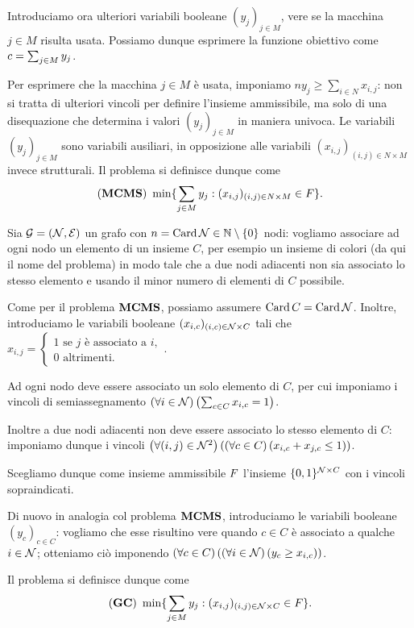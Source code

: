 \begin{Example}
	\par Introduciamo ora ulteriori variabili booleane $(y_j)_{j \in M}$, vere se la macchina $j \in M$ risulta usata. Possiamo dunque esprimere la funzione obiettivo come $c = \sum_{j \in M} y_j$.
	\par Per esprimere che la macchina $j \in M$ \`e usata, imponiamo $ny_j \geq \sum_{i \in N} x_{i,j}$: non si tratta di ulteriori vincoli per definire l'insieme ammissibile, ma solo di una disequazione che determina i valori $(y_j)_{j \in M}$ in maniera univoca. Le variabili $(y_j)_{j \in M}$ sono variabili ausiliari, in opposizione alle variabili $(x_{i,j})_{(i,j) \in N \times M}$ invece strutturali.
	Il problema si definisce dunque come
	$$(\textbf{MCMS})\ \min \lbrace \sum_{j \in M} y_j: (x_{i,j})_{(i,j) \in N \times M} \in F \rbrace.$$
\end{Example}
\begin{Example}
	 Sia $\mathcal{G} = (\mathcal{N},\mathcal{E})$ un grafo con $n = \operatorname{Card}{\mathcal{N}} \in \mathbb{N} \setminus \lbrace 0 \rbrace$ nodi: vogliamo associare ad ogni nodo un elemento di un insieme $C$, per esempio un insieme di colori (da qui il nome del problema) in modo tale che a due nodi adiacenti non sia associato lo stesso elemento e usando il minor numero di elementi di $C$ possibile.
	\par Come per il problema $\textbf{MCMS}$, possiamo assumere $\operatorname{Card}{C} = \operatorname{Card}{\mathcal{N}}$. Inoltre, introduciamo le variabili booleane $(x_{i,c})_{(i,c) \in \mathcal{N} \times C}$ tali che $x_{i,j} = \begin{cases} 1\text{ se }j\text{ \`e associato a }i,\\0\text{ altrimenti.}\end{cases}$.
	\par Ad ogni nodo deve essere associato un solo elemento di $C$, per cui imponiamo i vincoli di semiassegnamento $\left ( \forall i \in \mathcal{N} \right ) \left ( \sum_{c \in C} x_{i,c} = 1 \right )$.
	\par Inoltre a due nodi adiacenti non deve essere associato lo stesso elemento di $C$: imponiamo dunque i vincoli $\left ( \forall (i,j) \in \mathcal{N}^2 \right ) \left ( \left ( \forall c \in C \right ) \left ( x_{i,c} + x_{j,c} \leq 1 \right ) \right )$.
	\par Scegliamo dunque come insieme ammissibile $F$ l'insieme $\lbrace 0, 1\rbrace^{\mathcal{N} \times C}$ con i vincoli sopraindicati.
	\par Di nuovo in analogia col problema $\textbf{MCMS}$, introduciamo le variabili booleane $(y_c)_{c \in C}$: vogliamo che esse risultino vere quando $c \in C$ \`e associato a qualche $i \in \mathcal{N}$; otteniamo ci\`o imponendo $\left ( \forall c \in C \right ) \left ( \left ( \forall i \in \mathcal{N} \right ) \left ( y_c \geq x_{i,c} \right ) \right )$.
	\par Il problema si definisce dunque come
	$$(\textbf{GC})\ \min \lbrace \sum_{j \in M} y_j: (x_{i,j})_{(i,j) \in \mathcal{N} \times C} \in F \rbrace.$$
\end{Example}
